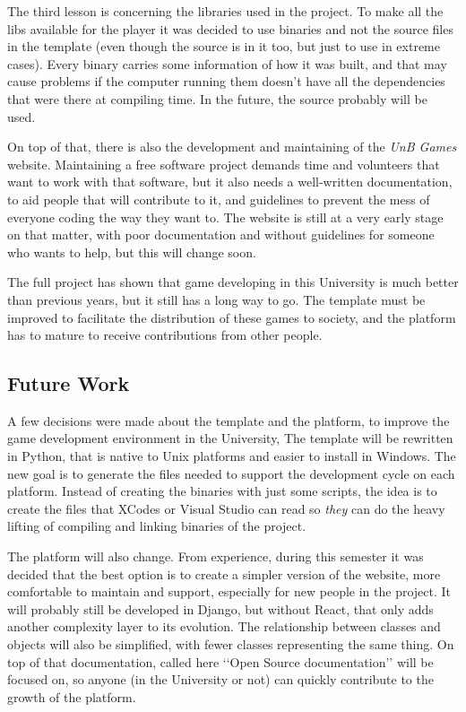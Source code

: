 The third lesson is concerning the libraries used in the project. To make all the libs available for the player it was decided to use binaries and not the source files in the template (even though the source is in it too, but just to use in extreme cases). Every binary carries some information of how it was built, and that may cause problems if the computer running them doesn't have all the dependencies that were there at compiling time. In the future, the source probably will be used.

On top of that, there is also the development and maintaining of the \textit{UnB Games} website. Maintaining a free software project demands time and volunteers that want to work with that software, but it also needs a well-written documentation, to aid people that will contribute to it, and guidelines to prevent the mess of everyone coding the way they want to. The website is still at a very early stage on that matter, with poor documentation and without guidelines for someone who wants to help, but this will change soon.

The full project has shown that game developing in this University is much better than previous years, but it still has a long way to go. The template must be improved to facilitate the distribution of these games to society, and the platform has to mature to receive contributions from other people.


\subsection*{Future Work}
\label{sec:future}


A few decisions were made about the template and the platform, to improve the game development environment in the University, The template will be rewritten in Python, that is native to Unix platforms and easier to install in Windows. The new goal is to generate the files needed to support the development cycle on each platform. Instead of creating the binaries with just some scripts, the idea is to create the files that XCodes or Visual Studio can read so \textit{they} can do the heavy lifting of compiling and linking binaries of the project.

The platform will also change. From experience, during this semester it was decided that the best option is to create a simpler version of the website, more comfortable to maintain and support, especially for new people in the project. It will probably still be developed in Django, but without React, that only adds another complexity layer to its evolution. The relationship between classes and objects will also be simplified, with fewer classes representing the same thing. On top of that documentation, called here \lq\lq Open Source documentation\rq\rq{} will be focused on, so anyone (in the University or not) can quickly contribute to the growth of the platform.

